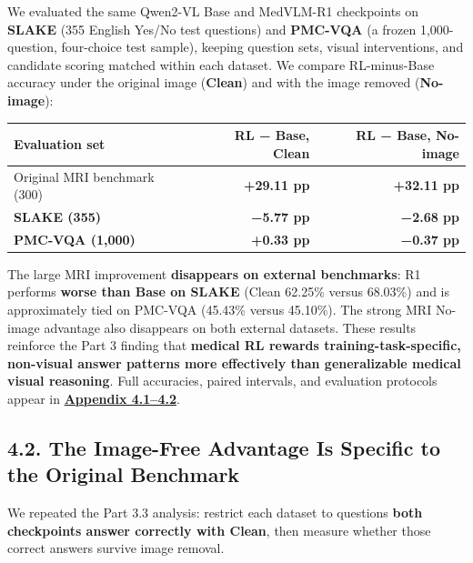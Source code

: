 \documentclass[
  10pt,
  a4paper,
]{article}
\newcounter{none} %
\begin{document}
We evaluated the same Qwen2-VL Base and MedVLM-R1 checkpoints on
\textbf{SLAKE} (355 English Yes/No test questions) and \textbf{PMC-VQA}
(a frozen 1,000-question, four-choice test sample), keeping question
sets, visual interventions, and candidate scoring matched within each
dataset. We compare RL-minus-Base accuracy under the original image
(\textbf{Clean}) and with the image removed (\textbf{No-image}):

{\def\LTcaptype{none} %
\begin{longtable}[]{@{}lrr@{}}
\toprule\noalign{}
Evaluation set & RL − Base, Clean & RL − Base, No-image \\
\midrule\noalign{}
\endhead
\bottomrule\noalign{}
\endlastfoot
Original MRI benchmark (300) & \textbf{+29.11 pp} & \textbf{+32.11
pp} \\
\textbf{SLAKE (355)} & \textbf{−5.77 pp} & \textbf{−2.68 pp} \\
\textbf{PMC-VQA (1,000)} & \textbf{+0.33 pp} & \textbf{−0.37 pp} \\
\end{longtable}
}

The large MRI improvement \textbf{disappears on external benchmarks}: R1
performs \textbf{worse than Base on SLAKE} (Clean 62.25\% versus
68.03\%) and is approximately tied on PMC-VQA (45.43\% versus 45.10\%).
The strong MRI No-image advantage also disappears on both external
datasets. These results reinforce the Part 3 finding that
\textbf{medical RL rewards training-task-specific, non-visual answer
patterns more effectively than generalizable medical visual reasoning}.
Full accuracies, paired intervals, and evaluation protocols appear in
\textbf{\hyperref[external-datasets-and-matched-evaluation]{Appendix
4.1--4.2}}.

\subsection{4.2. The Image-Free Advantage Is Specific to the Original
Benchmark}\label{the-image-free-advantage-is-specific-to-the-original-benchmark}

We repeated the Part 3.3 analysis: restrict each dataset to questions
\textbf{both checkpoints answer correctly with Clean}, then measure
whether those correct answers survive image removal.
\end{document}

